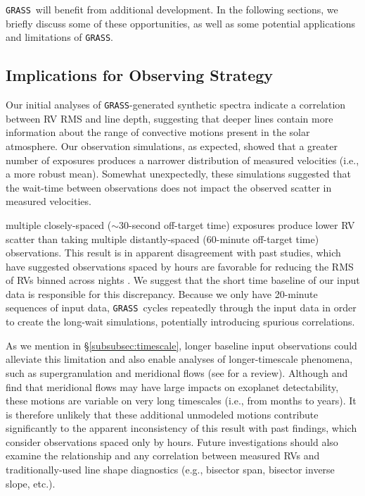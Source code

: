 \documentclass[twocolumn]{aastex63}
\newcommand{\grass}{\texttt{GRASS}}
\newcommand{\revise}[1]{#1}
\newcommand{\revisetwo}[1]{#1}
\begin{document}
\grass\ will benefit from additional development. In the following sections, we briefly discuss some of these opportunities, as well as some potential applications and limitations of \grass.  \par 

\subsection{Implications for Observing Strategy} 
Our initial analyses of \grass-generated synthetic spectra indicate a correlation between RV RMS and line depth, suggesting that deeper lines contain more information about the range of convective motions present in the solar atmosphere. Our observation simulations, as expected, showed that a greater number of exposures produces a narrower distribution of measured velocities (i.e., a more robust mean). Somewhat unexpectedly, these simulations suggested that \revisetwo{the wait-time between observations does not impact the observed scatter in measured velocities.} 

{multiple closely-spaced ($\sim$30-second off-target time) exposures produce lower RV scatter than taking multiple distantly-spaced (\revise{60}-minute off-target time) observations.} \revise{This result is in apparent disagreement with past studies, which have suggested observations spaced by hours are favorable} \revisetwo{for reducing the RMS of RVs binned across nights} \revise{\citep[e.g.,][]{Dumusque2011, Meunier2015, CollierCameron2019}.} \revise{We suggest that the short time baseline of our input data is responsible for this discrepancy. Because we only have 20-minute sequences of input data, \grass\ cycles repeatedly through the input data in order to create the long-wait simulations, potentially introducing spurious correlations.} \par 

As we mention in \S\ref{subsubsec:timescale}, longer baseline input observations could alleviate this limitation and also enable analyses of longer-timescale phenomena, such as supergranulation and meridional flows (see \citealt{Cegla2019b} for a review). \revise{Although \citet{Makarov2010} and \citet{Meunier2020b} find that meridional flows may have large impacts on exoplanet detectability, these motions are variable on very long timescales (i.e., from months to years). It is therefore unlikely that these additional unmodeled motions contribute significantly to the apparent inconsistency of this result with past findings, which consider observations spaced only by hours.} Future investigations should also examine the relationship and any correlation between measured RVs and traditionally-used line shape diagnostics (e.g., bisector span, bisector inverse slope, etc.). \par
\end{document}
